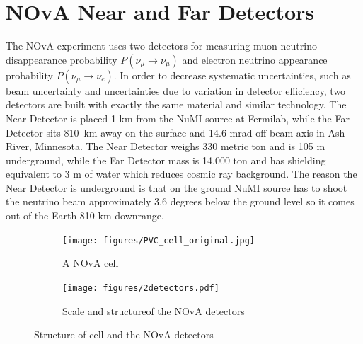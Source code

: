 \section{NOvA Near and Far Detectors}
The NOvA experiment uses two detectors for measuring muon neutrino disappearance probability 
$P(\nu_\mu \rightarrow \nu_\mu)$ and electron neutrino appearance probability $P(\nu_\mu \rightarrow \nu_e)$. 
In order to decrease systematic uncertainties, such as beam uncertainty and uncertainties due to variation
in detector efficiency, two detectors are built with exactly the same material and 
similar technology. The Near Detector is placed 1 km from the NuMI source at Fermilab, while the 
Far Detector sits 810~km away on the surface and 14.6 mrad off beam axis in Ash River, Minnesota. 
The Near Detector weighs 330 metric ton and is 105 m underground, while the Far Detector mass is 
14,000 ton and has shielding equivalent to 3 m of water which reduces cosmic ray background.
The reason the Near Detector is underground is that on the ground NuMI source has to shoot the neutrino beam 
approximately 3.6 degrees below the ground level so it comes out of the Earth 810 km downrange. 
\begin{figure}
\begin{subfigure}{.2\textwidth}
  \centering
  \texttt{[image: figures/PVC\_cell\_original.jpg]}
  \caption{A NOvA cell}
  \label{fig:cell}
\end{subfigure}%
\begin{subfigure}{.8\textwidth}
  \centering
  \texttt{[image: figures/2detectors.pdf]}
  \caption{Scale and structureof the NOvA detectors}
  \label{fig:2detectors}
\end{subfigure}
\caption{Structure of cell and the NOvA detectors}
\label{fig:cell_detectors}
\end{figure}

